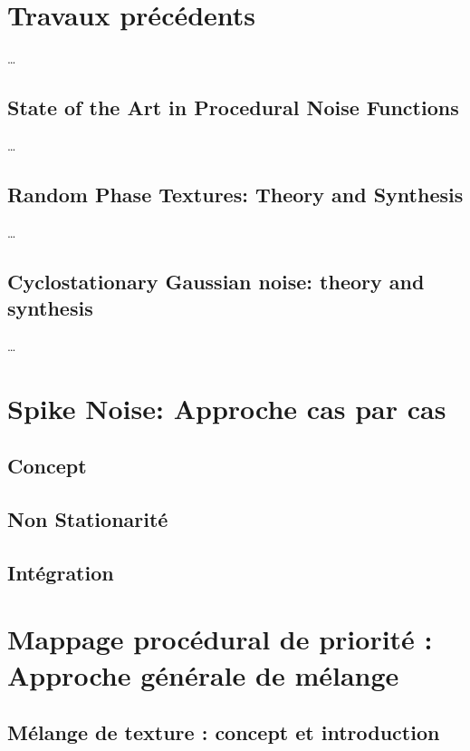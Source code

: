 \documentclass[9pt, twocolumn]{article} %
\begin{document}
\section{Travaux précédents}
\ldots

\subsection{State of the Art in Procedural Noise Functions}
\ldots

\subsection{Random Phase Textures: Theory and Synthesis}
\ldots

\subsection{Cyclostationary Gaussian noise: theory and synthesis}
\ldots

\section{Spike Noise: Approche cas par cas}

\subsection{Concept}

\subsection{Non Stationarité}

\subsection{Intégration}

\pagebreak

\section{Mappage procédural de priorité : Approche générale de mélange}

\subsection{Mélange de texture : concept et introduction}
\end{document}
